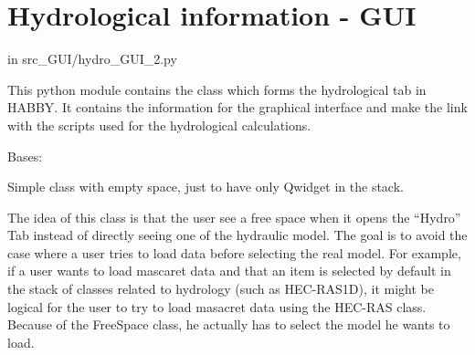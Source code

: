 \documentclass[letterpaper,10pt,english]{sphinxmanual}
\begin{document}
\section{Hydrological information - GUI}
\label{\detokenize{index:hydrological-information-gui}}
in src\_GUI/hydro\_GUI\_2.py

This python module contains the class which forms the hydrological tab in HABBY.
It contains the information for the graphical interface and make the link with the scripts
used for the hydrological calculations.
\label{\detokenize{index:module-src_GUI.hydro_GUI_2}}

\begin{fulllineitems}
\label{\detokenize{index:src_GUI.hydro_GUI_2.FreeSpace}}
Bases: 

Simple class with empty space, just to have only Qwidget in the stack.


The idea of this class is that the user see a free space when it opens the “Hydro” Tab instead
of directly seeing one of the hydraulic model. The goal is to avoid the case where a user tries to load data before
selecting the real model. For example, if a user wants to load mascaret data and that an item is selected by
default in the stack of classes related to hydrology (such as HEC-RAS1D), it might be logical for the user to try
to load masacret data using the HEC-RAS class. Because of the FreeSpace class, he actually has to select
the model he wants to load.

\end{fulllineitems}

\end{document}
